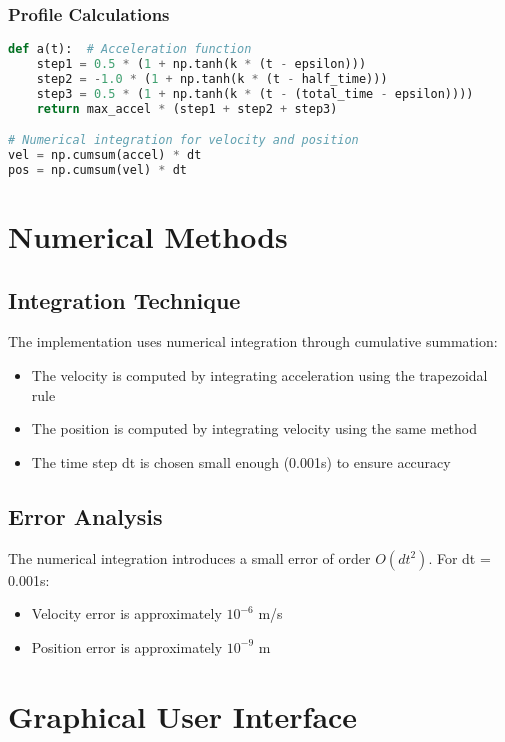 \documentclass[12pt,a4paper]{article}
\begin{document}
\subsubsection{Profile Calculations}
\begin{lstlisting}[language=Python]
def a(t):  # Acceleration function
    step1 = 0.5 * (1 + np.tanh(k * (t - epsilon)))
    step2 = -1.0 * (1 + np.tanh(k * (t - half_time)))
    step3 = 0.5 * (1 + np.tanh(k * (t - (total_time - epsilon))))
    return max_accel * (step1 + step2 + step3)

# Numerical integration for velocity and position
vel = np.cumsum(accel) * dt
pos = np.cumsum(vel) * dt
\end{lstlisting}

\section{Numerical Methods}

\subsection{Integration Technique}
The implementation uses numerical integration through cumulative summation:
\begin{itemize}
\item The velocity is computed by integrating acceleration using the trapezoidal rule
\item The position is computed by integrating velocity using the same method
\item The time step dt is chosen small enough (0.001s) to ensure accuracy
\end{itemize}

\subsection{Error Analysis}
The numerical integration introduces a small error of order $O(dt^2)$. For dt = 0.001s:
\begin{itemize}
\item Velocity error is approximately $10^{-6}$ m/s
\item Position error is approximately $10^{-9}$ m
\end{itemize}

\section{Graphical User Interface}
\end{document}
